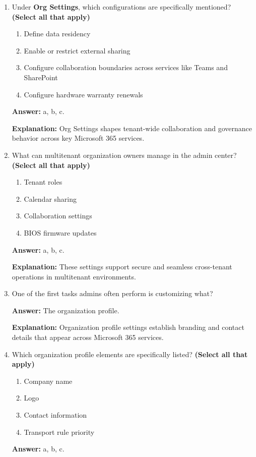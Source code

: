 \documentclass[10pt]{article}
\begin{document}
\begin{enumerate}[leftmargin=*]
\item Under \textbf{Org Settings}, which configurations are specifically mentioned? \textbf{(Select all that apply)}
\begin{enumerate}[label=\alph*., leftmargin=1.5em]
\item Define data residency
\item Enable or restrict external sharing
\item Configure collaboration boundaries across services like Teams and SharePoint
\item Configure hardware warranty renewals
\end{enumerate}
\textbf{Answer:} a, b, c.

\textbf{Explanation:} Org Settings shapes tenant-wide collaboration and governance behavior across key Microsoft 365 services.

\item What can multitenant organization owners manage in the admin center? \textbf{(Select all that apply)}
\begin{enumerate}[label=\alph*., leftmargin=1.5em]
\item Tenant roles
\item Calendar sharing
\item Collaboration settings
\item BIOS firmware updates
\end{enumerate}
\textbf{Answer:} a, b, c.

\textbf{Explanation:} These settings support secure and seamless cross-tenant operations in multitenant environments.

\item One of the first tasks admins often perform is customizing what?

\textbf{Answer:} The organization profile.

\textbf{Explanation:} Organization profile settings establish branding and contact details that appear across Microsoft 365 services.

\item Which organization profile elements are specifically listed? \textbf{(Select all that apply)}
\begin{enumerate}[label=\alph*., leftmargin=1.5em]
\item Company name
\item Logo
\item Contact information
\item Transport rule priority
\end{enumerate}
\textbf{Answer:} a, b, c.


\end{enumerate}
\end{document}
